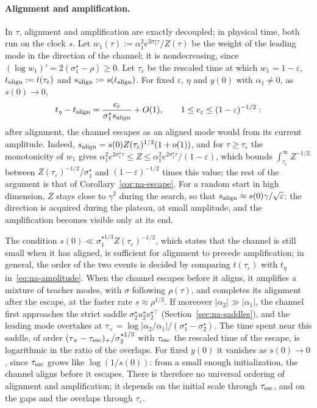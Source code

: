 \documentclass[11pt]{article}
\theoremstyle{definition}
\numberwithin{equation}{section}
\begin{document}
\paragraph{Alignment and amplification.}
In $\tau$, alignment and amplification are exactly decoupled; in physical time, both run on the clock $s$. Let $w_1(\tau):=\alpha_1^2e^{2\sigma^\star_1\tau}/Z(\tau)$ be the weight of the leading mode in the direction of the channel; it is nondecreasing, since $(\log w_1)'=2(\sigma^\star_1-\rho)\ge0$. Let $\tau_\varepsilon$ be the rescaled time at which $w_1=1-\varepsilon$, $t_{\rm align}:=t(\tau_\varepsilon)$ and $s_{\rm align}:=s(t_{\rm align})$. For fixed $\varepsilon$, $\eta$ and $y(0)$ with $\alpha_1\neq0$, as $s(0)\to0$,
\begin{equation}\label{eq:na-align-amp}
t_\eta-t_{\rm align}=\frac{c_\varepsilon}{\sigma^\star_1s_{\rm align}}+O(1),\qquad1\le c_\varepsilon\le(1-\varepsilon)^{-1/2}:
\end{equation}
after alignment, the channel escapes as an aligned mode would from its current amplitude. Indeed, $s_{\rm align}=s(0)Z(\tau_\varepsilon)^{1/2}(1+o(1))$, and for $\tau\ge\tau_\varepsilon$ the monotonicity of $w_1$ gives $\alpha_1^2e^{2\sigma^\star_1\tau}\le Z\le\alpha_1^2e^{2\sigma^\star_1\tau}/(1-\varepsilon)$, which bounds $\int_{\tau_\varepsilon}^\infty Z^{-1/2}$ between $Z(\tau_\varepsilon)^{-1/2}/\sigma^\star_1$ and $(1-\varepsilon)^{-1/2}$ times this value; the rest of the argument is that of Corollary~\ref{cor:na-escape}. For a random start in high dimension, $Z$ stays close to $\gamma^2$ during the search, so that $s_{\rm align}\approx s(0)\gamma/\sqrt\varepsilon$: the direction is acquired during the plateau, at small amplitude, and the amplification becomes visible only at its end.

The condition $s(0)\ll\sigma^{\star1/3}_1Z(\tau_\varepsilon)^{-1/2}$, which states that the channel is still small when it has aligned, is sufficient for alignment to precede amplification; in general, the order of the two events is decided by comparing $t(\tau_\varepsilon)$ with $t_\eta$ in~\eqref{eq:na-amplitude}. When the channel escapes before it aligns, it amplifies a mixture of teacher modes, with $\sigma$ following $\rho(\tau)$, and completes its alignment after the escape, at the faster rate $s\approx\rho^{1/3}$. If moreover $|\alpha_2|\gg|\alpha_1|$, the channel first approaches the strict saddle $\sigma^\star_2u^\star_2v^{\star\top}_2$ (Section~\ref{sec:na-saddles}), and the leading mode overtakes at $\tau_\times=\log|\alpha_2/\alpha_1|/(\sigma^\star_1-\sigma^\star_2)$. The time spent near this saddle, of order $(\tau_\times-\tau_{\rm esc})_+/\sigma^{\star1/3}_2$ with $\tau_{\rm esc}$ the rescaled time of the escape, is logarithmic in the ratio of the overlaps. For fixed $y(0)$ it vanishes as $s(0)\to0$, since $\tau_{\rm esc}$ grows like $\log(1/s(0))$: from a small enough initialization, the channel aligns before it escapes. There is therefore no universal ordering of alignment and amplification; it depends on the initial scale through $\tau_{\rm esc}$, and on the gaps and the overlaps through $\tau_\varepsilon$.
\end{document}
